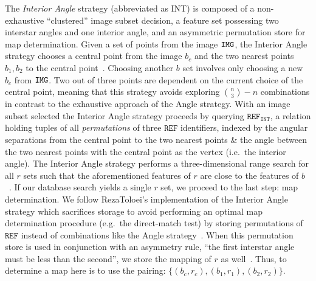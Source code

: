 The \textit{Interior Angle} strategy (abbreviated as INT) is composed of a non-exhaustive ``clustered'' image subset decision, a feature set possessing two interstar angles and one interior angle, and an asymmetric permutation store for map determination.
Given a set of points from the image $\texttt{IMG}$, the Interior Angle strategy chooses a central point from the image $b_c$ and the two nearest points $b_1, b_2$ to the central point~\cite{liebe:starTrackersAttitudeDetermination}.
Choosing another $b$ set involves only choosing a new $b_c$ from $\texttt{IMG}$.
Two out of three points are dependent on the current choice of the central point, meaning that this strategy avoids exploring $\binom{n}{3} - n$ combinations in contrast to the exhaustive approach of the Angle strategy.
With an image subset selected the Interior Angle strategy proceeds by querying $\texttt{REF}_\texttt{INT}$, a relation holding tuples of all \emph{permutations} of three $\texttt{REF}$ identifiers, indexed by the angular separations from the central point to the two nearest points \& the angle between the two nearest points with the central point as the vertex (i.e.\ the interior angle).
The Interior Angle strategy performs a three-dimensional range search for all $r$ sets such that the aforementioned features of $r$ are close to the features of $b$~\cite{bratt:analysisStarIdentification}.
If our database search yields a single $r$ set, we proceed to the last step: map determination.
We follow RezaToloei's implementation of the Interior Angle strategy which sacrifices storage to avoid performing an optimal map determination procedure (e.g.\ the direct-match test) by storing permutations of $\texttt{REF}$ instead of combinations like the Angle strategy~\cite{toloei:compositeIdentification}.
When this permutation store is used in conjunction with an asymmetry rule, ``the first interstar angle must be less than the second'', we store the mapping of $r$ as well~\cite{anderson:autonomousStarSensing}.
Thus, to determine a map here is to use the pairing: $\{(b_c, r_c), (b_1, r_1), (b_2, r_2)\}$.


